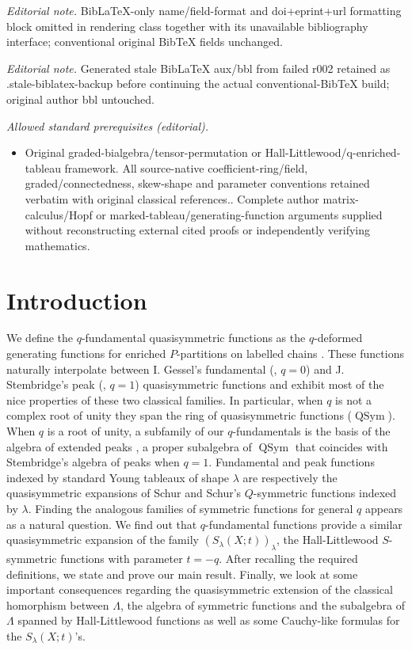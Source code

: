 \documentclass[revision]{FPSAC2024}
\newcommand{\la}{\lambda}
\newcommand{\QSym}{\operatorname{QSym}}
\begin{document}
\noindent\textit{Editorial note.} BibLaTeX-only name/field-format and doi+eprint+url formatting block omitted in rendering class together with its unavailable bibliography interface; conventional original BibTeX fields unchanged.\par\medskip
\noindent\textit{Editorial note.} Generated stale BibLaTeX aux/bbl from failed r002 retained as .stale-biblatex-backup before continuing the actual conventional-BibTeX build; original author bbl untouched.\par\medskip
\noindent\textit{Allowed standard prerequisites (editorial).}\begin{itemize}
\item Original graded-bialgebra/tensor-permutation or Hall-Littlewood/q-enriched-tableau framework. All source-native coefficient-ring/field, graded/connectedness, skew-shape and parameter conventions retained verbatim with original classical references.. Complete author matrix-calculus/Hopf or marked-tableau/generating-function arguments supplied without reconstructing external cited proofs or independently verifying mathematics.
\end{itemize}\medskip
\section{Introduction}
We define the $q$-fundamental quasisymmetric functions as the $q$-deformed generating functions for enriched $P$-partitions on labelled chains \cite{GriVas22, GriVas23}. These functions naturally interpolate between I. Gessel's fundamental (\cite{Ges84}, $q=0$) and J. Stembridge's peak (\cite{Ste97}, $q=1$) quasisymmetric functions and exhibit most of the nice properties of these two classical families. In particular, when $q$ is not a complex root of unity they span the ring of quasisymmetric functions ($\QSym$). When $q$ is a root of unity, a subfamily of our $q$-fundamentals is the basis of the algebra of extended peaks \cite{GriVas23}, a proper subalgebra of $\QSym$ that coincides with Stembridge's algebra of peaks when $q=1$. Fundamental and peak functions indexed by standard Young tableaux of shape $\la$ are respectively the quasisymmetric expansions of Schur and Schur's $Q$-symmetric functions indexed by $\la$. Finding the analogous families of symmetric functions for general $q$ appears as a natural question. We find out that $q$-fundamental functions provide a similar quasisymmetric expansion of the family $\left (S_\la(X;t)\right)_\la$, the Hall-Littlewood $S$-symmetric functions with parameter $t=-q$. After recalling the required definitions, we state and prove our main result. Finally, we look at some important consequences regarding the quasisymmetric extension of the classical homorphism between $\Lambda$, the algebra of symmetric functions and the subalgebra of $\Lambda$ spanned by Hall-Littlewood functions as well as some Cauchy-like formulas for the $S_\la(X;t)$'s.
\end{document}
